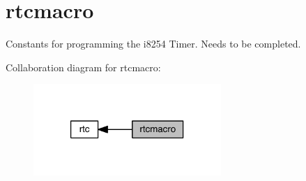 \hypertarget{group__rtcmacro}{}\section{rtcmacro}
\label{group__rtcmacro}


Constants for programming the i8254 Timer. Needs to be completed.  


Collaboration diagram for rtcmacro\+:
\nopagebreak
\begin{figure}[H]
\begin{center}
\leavevmode
\includegraphics[width=202pt]{group__rtcmacro}
\end{center}
\end{figure}
